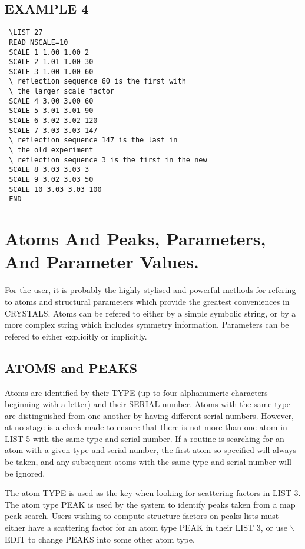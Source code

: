 \documentclass[10pt,a4paper]{report}
\begin{document}
\section{EXAMPLE 4}
\small\begin{verbatim}
 \LIST 27
 READ NSCALE=10
 SCALE 1 1.00 1.00 2
 SCALE 2 1.01 1.00 30
 SCALE 3 1.00 1.00 60
 \ reflection sequence 60 is the first with 
 \ the larger scale factor
 SCALE 4 3.00 3.00 60
 SCALE 5 3.01 3.01 90
 SCALE 6 3.02 3.02 120
 SCALE 7 3.03 3.03 147 
 \ reflection sequence 147 is the last in 
 \ the old experiment
 \ reflection sequence 3 is the first in the new
 SCALE 8 3.03 3.03 3
 SCALE 9 3.02 3.03 50
 SCALE 10 3.03 3.03 100
 END
\end{verbatim}\normalsize


\chapter{Atoms And Peaks, Parameters, And Parameter Values.}


For the user, it is probably the highly stylised and powerful methods for refering to atoms and structural parameters which provide the  greatest conveniences in CRYSTALS. Atoms can be refered to either by a simple symbolic string, or by a more complex string which includes symmetry information. Parameters can  be refered to either explicitly or implicitly.

\section{ATOMS and PEAKS}


Atoms are identified by their TYPE (up to four alphanumeric characters
 beginning with a letter) and their SERIAL number.
 Atoms with the same type are distinguished from one another by having
 different serial numbers. However, at no stage is a check made to ensure
 that there is not more than one atom in LIST 5 with the same type and
 serial number. If a routine is searching for an atom with a given type
 and serial number, the first atom so specified will always be taken, and any
 subsequent atoms with the same type and serial number will be ignored.


The atom 
 TYPE is used as the key when looking for scattering factors in LIST 3.
 The atom type PEAK is used by the system to identify peaks taken from a 
 map peak search. Users wishing to compute structure factors on peaks lists
 must either have a scattering factor for an atom type PEAK in their LIST 3,
 or use $\backslash$EDIT to change PEAKS into some other atom type.
\end{document}
